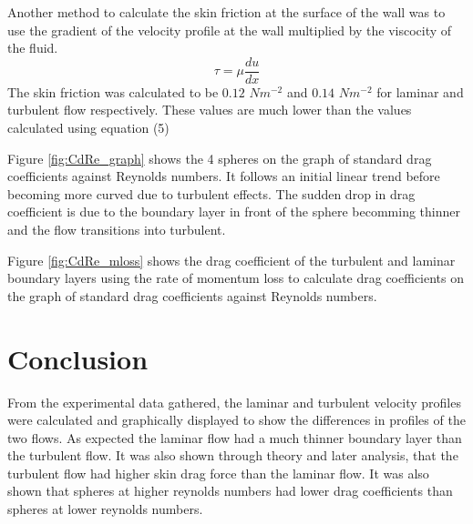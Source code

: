 \documentclass{article}
\begin{document}
Another method to calculate the skin friction at the surface of the wall was to use the
gradient of the velocity profile at the wall multiplied by the viscocity of the fluid.
\begin{equation}
    \tau = \mu \frac{du}{dx}
\end{equation}
The skin friction was calculated to be $ 0.12 $ $Nm^{-2}$ and $ 0.14 $ $Nm^{-2}$ for laminar and turbulent flow respectively.
These values are much lower than the values calculated using equation (5)

Figure \ref{fig:CdRe_graph} shows the 4 spheres on the graph of standard drag coefficients 
against Reynolds numbers. It follows an initial linear trend before becoming more curved due to turbulent effects.
The sudden drop in drag coefficient is due to the boundary layer in front of the sphere
becomming thinner and the flow transitions into turbulent.

Figure \ref{fig:CdRe_mloss} shows the drag coefficient of the turbulent and laminar
boundary layers using the rate of momentum loss to calculate drag coefficients on the graph 
of standard drag coefficients against Reynolds numbers.


\section{Conclusion}

From the experimental data gathered, the laminar and turbulent velocity profiles were calculated
and graphically displayed to show the differences in profiles of the two flows. As expected the laminar flow had a much thinner 
boundary layer than the turbulent flow. It was also shown through theory and later analysis, 
that the turbulent flow had higher skin drag force than the laminar flow. It was also shown
that spheres at higher reynolds numbers had lower drag coefficients than spheres at lower reynolds numbers.
\end{document}

